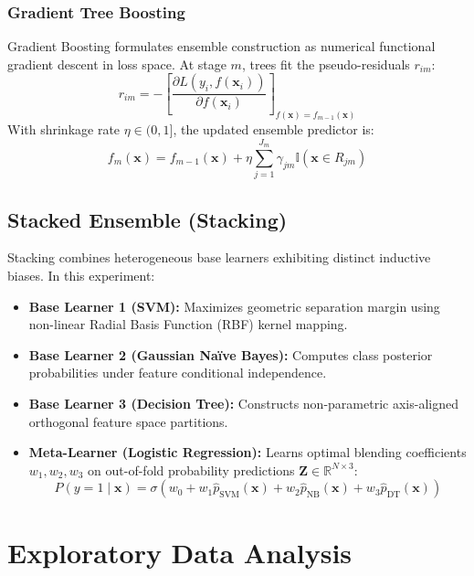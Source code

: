 \documentclass[12pt,a4paper]{article}
\begin{document}
\subsubsection{Gradient Tree Boosting}
Gradient Boosting formulates ensemble construction as numerical functional gradient descent in loss space. At stage $m$, trees fit the pseudo-residuals $r_{im}$:
\begin{equation}
r_{im} = -\left[ \frac{\partial L(y_i, f(\mathbf{x}_i))}{\partial f(\mathbf{x}_i)} \right]_{f(\mathbf{x}) = f_{m-1}(\mathbf{x})}
\end{equation}
With shrinkage rate $\eta \in (0, 1]$, the updated ensemble predictor is:
\begin{equation}
f_m(\mathbf{x}) = f_{m-1}(\mathbf{x}) + \eta \sum_{j=1}^{J_m} \gamma_{jm} \mathbb{I}(\mathbf{x} \in R_{jm})
\end{equation}

\subsection{Stacked Ensemble (Stacking)}
Stacking combines heterogeneous base learners exhibiting distinct inductive biases. In this experiment:
\begin{itemize}
    \item \textbf{Base Learner 1 (SVM):} Maximizes geometric separation margin using non-linear Radial Basis Function (RBF) kernel mapping.
    \item \textbf{Base Learner 2 (Gaussian Na\"ive Bayes):} Computes class posterior probabilities under feature conditional independence.
    \item \textbf{Base Learner 3 (Decision Tree):} Constructs non-parametric axis-aligned orthogonal feature space partitions.
    \item \textbf{Meta-Learner (Logistic Regression):} Learns optimal blending coefficients $w_1, w_2, w_3$ on out-of-fold probability predictions $\mathbf{Z} \in \mathbb{R}^{N \times 3}$:
    \begin{equation}
    P(y=1 \mid \mathbf{x}) = \sigma\left(w_0 + w_1 \hat{p}_{\text{SVM}}(\mathbf{x}) + w_2 \hat{p}_{\text{NB}}(\mathbf{x}) + w_3 \hat{p}_{\text{DT}}(\mathbf{x})\right)
    \end{equation}
\end{itemize}

\section{Exploratory Data Analysis}
\end{document}
